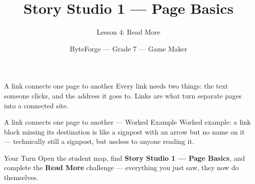 \documentclass[aspectratio=169]{beamer}
\title{Story Studio 1 — Page Basics}
\subtitle{Lesson 4: Read More}
\author{ByteForge --- Grade 7 --- Game Maker}
\date{}
\begin{document}
\begin{frame}
    \titlepage
\end{frame}

\begin{frame}{A link connects one page to another}
    \Large
    Every link needs two things: the text someone clicks, and the address it goes to. Links are what turn separate pages into a connected site.
\end{frame}

\begin{frame}{A link connects one page to another --- Worked Example}
    \Large
    Worked example: a link block missing its destination is like a signpost with an arrow but no name on it — technically still a signpost, but useless to anyone reading it.
\end{frame}

\begin{frame}{Your Turn}
    \Large
    Open the student map, find \textbf{Story Studio 1 — Page Basics}, and complete
    the \textbf{Read More} challenge --- everything you just saw, they now do themselves.
\end{frame}
\end{document}
